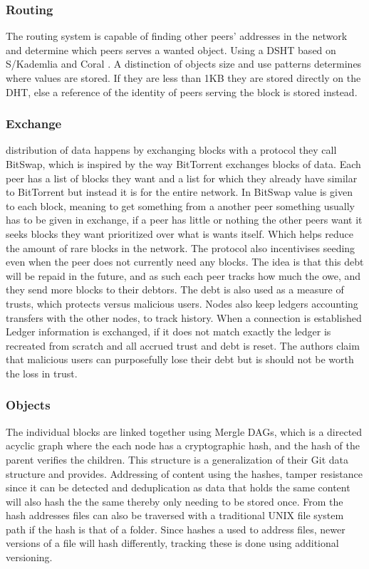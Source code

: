 \subsubsection{Routing}
The routing system is capable of finding other peers' addresses in the network and determine which peers serves a wanted object. Using a \acs{DSHT} based on S/Kademlia and Coral \cite{baumgart2007skademlia, freedman2004coral}. A distinction of objects size and use patterns determines where values are stored. If they are less than 1KB they are stored directly on the \acs{DHT}, else a reference of the identity of peers serving the block is stored instead. 

\subsubsection{Exchange}
distribution of data happens by exchanging blocks with a protocol they call BitSwap, which is inspired by the way BitTorrent exchanges blocks of data. Each peer has a list of blocks they want and a list for which they already have similar to BitTorrent but instead it is for the entire network. In BitSwap value is given to each block, meaning to get something from a another peer something usually has to be given in exchange, if a peer has little or nothing the other peers want it seeks blocks they want prioritized over what is wants itself. Which helps reduce the amount of rare blocks in the network.
The protocol also incentivises seeding even when the peer does not currently need any blocks. The idea is that this debt will be repaid in the future, and as such each peer tracks how much the owe, and they send more blocks to their debtors. The debt is also used as a measure of trusts, which protects versus malicious users.
Nodes also keep ledgers accounting transfers with the other nodes, to track history. When a connection is established Ledger information is exchanged, if it does not match exactly the ledger is recreated from scratch and all accrued trust and debt is reset. The authors claim that malicious users can purposefully lose their debt but is should not be worth the loss in trust.

\subsubsection{Objects}
The individual blocks are linked together using Mergle \acs{DAG}s, which is a directed acyclic graph where the each node has a cryptographic hash, and the hash of the parent verifies the children. This structure is a generalization of their Git data structure and provides. Addressing of content using the hashes, tamper resistance since it can be detected and deduplication as data that holds the same content will also hash the the same thereby only needing to be stored once. From the hash addresses files can also be traversed with a traditional UNIX file system path if the hash is that of a folder.
Since hashes a used to address files, newer versions of a file will hash differently, tracking these is done using additional versioning.


